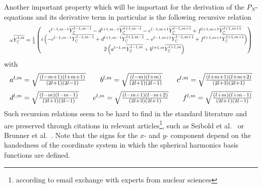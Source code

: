 Another important property which will be important for the derivation of the $P_N$-equations and its derivative term in particular is the following recursive relation
\begin{equation}
\label{eq:recursive_relation}
\resizebox{1.0\hsize}{!}{$\omega\overline{\SHBC^{l,m}} = \frac{1}{2}
\begin{pmatrix}
\ c^{l-1, m-1}\overline{\SHBC^{l-1,m-1}} - d^{l+1, m-1}\overline{\SHBC^{l+1,m-1}} - e^{l-1, m+1}\overline{\SHBC^{l-1,m+1}} + f^{l+1, m+1}\overline{\SHBC^{l+1,m+1}}\\
i\left(-c^{l-1, m-1}\overline{\SHBC^{l-1,m-1}} + d^{l+1, m-1}\overline{\SHBC^{l+1,m-1}} - e^{l-1, m+1}\overline{\SHBC^{l-1,m+1}} + f^{l+1, m+1}\overline{\SHBC^{l+1,m+1}}\right) \\
2\left(a^{l-1, m}\overline{\SHBC^{l-1,m}}+b^{l+1, m}\overline{\SHBC^{l+1,m}}\right)
\end{pmatrix}$}
\end{equation}
with
\begin{equation*}
\resizebox{1.0\hsize}{!}{$
a^{l,m}= \sqrt{\frac{\left(l-m+1\right)\left(l+m+1\right)}{\left(2l+1\right)\left(2l-1\right)}} \qquad
b^{l,m}= \sqrt{\frac{\left(l-m\right)\left(l+m\right)}{\left(2l+1\right)\left(2l-1\right)}} \qquad
c^{l,m}= \sqrt{\frac{\left(l+m+1\right)\left(l+m+2\right)}{\left(2l+3\right)\left(2l+1\right)}}
$}
\end{equation*}
\begin{equation*}
\resizebox{1.0\hsize}{!}{$
d^{l,m}= \sqrt{\frac{\left(l-m\right)\left(l-m-1\right)}{\left(2l+1\right)\left(2l-1\right)}} \qquad
e^{l,m}= \sqrt{\frac{\left(l-m+1\right)\left(l-m+2\right)}{\left(2l+3\right)\left(2l+1\right)}} \qquad
f^{l,m}= \sqrt{\frac{\left(l+m\right)\left(l+m-1\right)}{\left(2l+1\right)\left(2l-1\right)}}
$}
\end{equation*}
Such recursion relations seem to be hard to find in the standard literature and are preserved through citations in relevant articles\footnote{according to email exchange with experts from nuclear sciences}, such as Seibold et al.~\cite{Seibold14} or Brunner et al.~\cite{Brunner05}. Note that the signs for the $x$- and $y$- component depend on the handedness of the coordinate system in which the spherical harmonics basis functions are defined.


